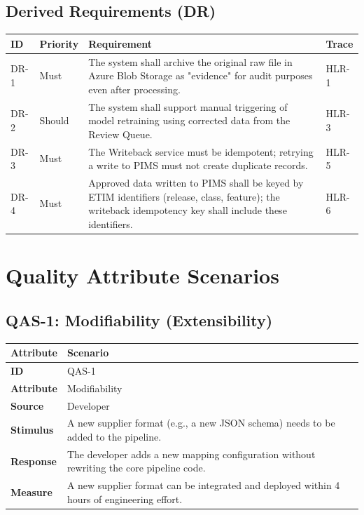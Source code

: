 \documentclass[12pt, a4paper]{article}
\begin{document}
\subsection{Derived Requirements (DR)}
\begin{tabular}{@{}l l >{\raggedright\arraybackslash}p{8cm} l@{}}
\toprule
\textbf{ID} & \textbf{Priority} & \textbf{Requirement} & \textbf{Trace} \\
\midrule
DR-1 & Must & The system shall archive the original raw file in Azure Blob Storage as "evidence" for audit purposes even after processing. & HLR-1 \\
\addlinespace
DR-2 & Should & The system shall support manual triggering of model retraining using corrected data from the Review Queue. & HLR-3 \\
\addlinespace
DR-3 & Must & The Writeback service must be idempotent; retrying a write to PIMS must not create duplicate records. & HLR-5 \\
\addlinespace
DR-4 & Must & Approved data written to PIMS shall be keyed by ETIM identifiers (release, class, feature); the writeback idempotency key shall include these identifiers. & HLR-6 \\
\bottomrule
\end{tabular}

\newpage
\section{Quality Attribute Scenarios}

\subsection*{QAS-1: Modifiability (Extensibility)}
\begin{longtable}{@{}lp{12cm}@{}}
\toprule
\textbf{Attribute} & \textbf{Scenario} \\
\midrule
\textbf{ID} & QAS-1 \\
\textbf{Attribute} & Modifiability \\
\textbf{Source} & Developer \\
\textbf{Stimulus} & A new supplier format (e.g., a new JSON schema) needs to be added to the pipeline. \\
\textbf{Response} & The developer adds a new mapping configuration without rewriting the core pipeline code. \\
\textbf{Measure} & A new supplier format can be integrated and deployed within 4 hours of engineering effort. \\
\bottomrule
\end{longtable}
\end{document}
